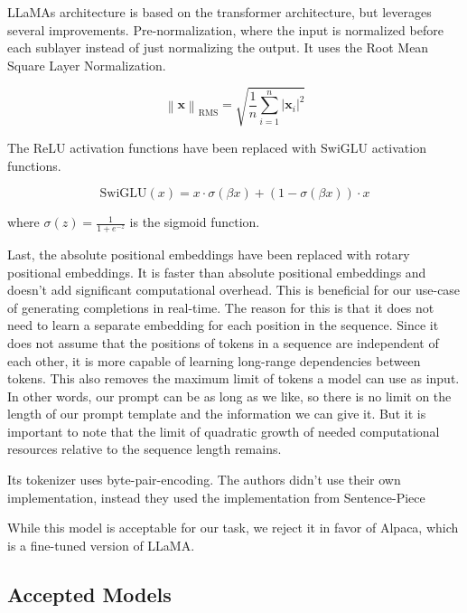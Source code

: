 LLaMAs architecture is based on the transformer architecture, but leverages several improvements. Pre-normalization, where the input is normalized before each sublayer instead  of just normalizing the output. It uses the Root Mean Square Layer Normalization\cite{zhang2019root}.

\newcommand{\norm}[1]{\left\lVert#1\right\rVert}

\[
\norm{\mathbf{x}}_{\text{RMS}} = \sqrt{\frac{1}{n} \sum_{i=1}^n |\mathbf{x}_i|^2}
\]


The ReLU activation functions have been replaced with SwiGLU activation functions.


\begin{equation}
\text{SwiGLU}(x) = x \cdot \sigma(\beta x) + (1 - \sigma(\beta x)) \cdot x
\end{equation}

where \(\sigma(z) = \frac{1}{1 + e^{-z}}\) is the sigmoid function.

Last, the absolute positional embeddings have been replaced with rotary positional embeddings. It is faster than absolute positional embeddings and doesn't add significant computational overhead. This is beneficial for our use-case of generating completions in real-time. The reason for this is that it does not need to learn  a separate embedding for each position in the sequence. Since it does not assume that the positions of tokens in a sequence are independent of each other, it is more capable of learning long-range dependencies between tokens. This also removes the maximum limit of tokens a model can use as input. In other words, our prompt can be as long as we like, so there is no limit on the length of our prompt template and the information we can give it. But it is important to note that the limit of quadratic growth of needed computational resources 
relative to the sequence length remains.



Its tokenizer uses byte-pair-encoding\cite{touvron2023llama}. The authors didn't use their own implementation, instead they used the implementation from Sentence-Piece \cite{kudo2018sentencepiece}



While this model is acceptable for our task, we reject it in favor of Alpaca, which is a fine-tuned version of LLaMA.

\subsection{Accepted Models}

